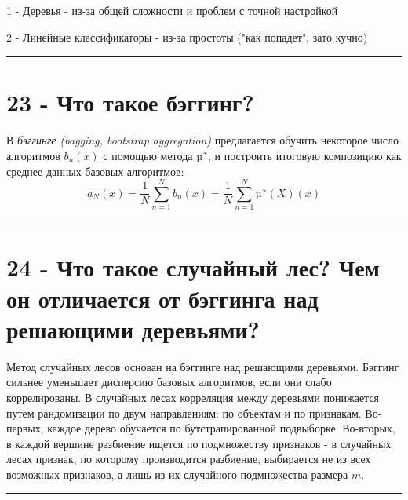 \documentclass[11pt]{article}
\begin{document}
1 - Деревья - из-за общей сложности и проблем с точной настройкой

2 - Линейные классификаторы - из-за простоты ("как попадет", зато кучно)

    \begin{center}\rule{0.5\linewidth}{\linethickness}\end{center}

    \section{23 - Что такое
бэггинг?}\label{ux447ux442ux43e-ux442ux430ux43aux43eux435-ux431ux44dux433ux433ux438ux43dux433}

В \emph{бэггинге (bagging, bootstrap aggregation)} предлагается обучить
некоторое число алгоритмов \(b_n(x)\) с помощью метода \(µ˜\), и
построить итоговую композицию как среднее данных базовых алгоритмов:
\[a_N(x) = \frac{1}{N}\sum_{n=1}^Nb_n(x) = \frac{1}{N}\sum_{n=1}^Nµ˜(X)(x)\]

    \begin{center}\rule{0.5\linewidth}{\linethickness}\end{center}

    \section{24 - Что такое случайный лес? Чем он отличается от бэггинга над
решающими
деревьями?}\label{ux447ux442ux43e-ux442ux430ux43aux43eux435-ux441ux43bux443ux447ux430ux439ux43dux44bux439-ux43bux435ux441-ux447ux435ux43c-ux43eux43d-ux43eux442ux43bux438ux447ux430ux435ux442ux441ux44f-ux43eux442-ux431ux44dux433ux433ux438ux43dux433ux430-ux43dux430ux434-ux440ux435ux448ux430ux44eux449ux438ux43cux438-ux434ux435ux440ux435ux432ux44cux44fux43cux438}

Метод случайных лесов основан на бэггинге над решающими деревьями.
Бэггинг сильнее уменьшает дисперсию базовых алгоритмов, если они слабо
коррелированы. В случайных лесах корреляция между деревьями понижается
путем рандомизации по двум направлениям: по объектам и по признакам.
Во-первых, каждое дерево обучается по бутстрапированной подвыборке.
Во-вторых, в каждой вершине разбиение ищется по подмножеству признаков -
в случайных лесах признак, по которому производится разбиение,
выбирается не из всех возможных признаков, а лишь из их случайного
подмножества размера \(m\).

    \begin{center}\rule{0.5\linewidth}{\linethickness}\end{center}
\end{document}
